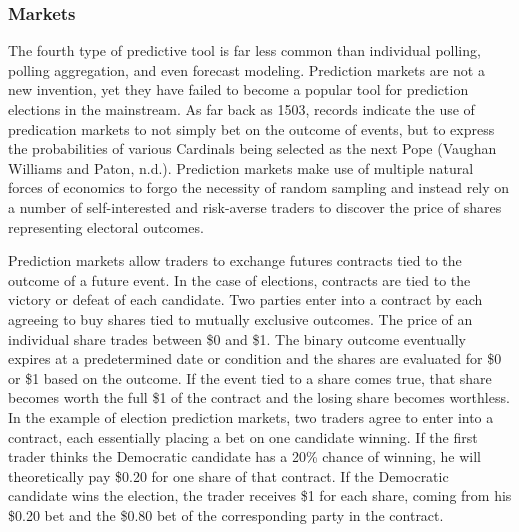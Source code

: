 \documentclass[]{article}
\begin{document}
\subsubsection{Markets}\label{markets}

The fourth type of predictive tool is far less common than individual
polling, polling aggregation, and even forecast modeling. Prediction
markets are not a new invention, yet they have failed to become a
popular tool for prediction elections in the mainstream. As far back as
1503, records indicate the use of predication markets to not simply bet
on the outcome of events, but to express the probabilities of various
Cardinals being selected as the next Pope (Vaughan Williams and Paton,
n.d.). Prediction markets make use of multiple natural forces of
economics to forgo the necessity of random sampling and instead rely on
a number of self-interested and risk-averse traders to discover the
price of shares representing electoral outcomes.

Prediction markets allow traders to exchange futures contracts tied to
the outcome of a future event. In the case of elections, contracts are
tied to the victory or defeat of each candidate. Two parties enter into
a contract by each agreeing to buy shares tied to mutually exclusive
outcomes. The price of an individual share trades between \$0 and \$1.
The binary outcome eventually expires at a predetermined date or
condition and the shares are evaluated for \$0 or \$1 based on the
outcome. If the event tied to a share comes true, that share becomes
worth the full \$1 of the contract and the losing share becomes
worthless. In the example of election prediction markets, two traders
agree to enter into a contract, each essentially placing a bet on one
candidate winning. If the first trader thinks the Democratic candidate
has a 20\% chance of winning, he will theoretically pay \$0.20 for one
share of that contract. If the Democratic candidate wins the election,
the trader receives \$1 for each share, coming from his \$0.20 bet and
the \$0.80 bet of the corresponding party in the contract.
\end{document}
